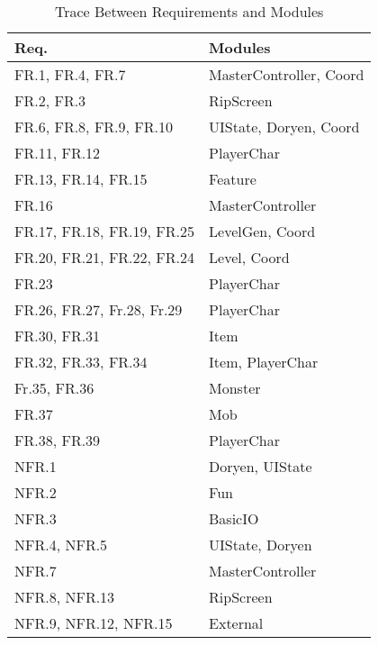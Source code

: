 \documentclass[12pt, titlepage]{article}
\begin{document}
	\begin{table}[H]
		\centering
		\begin{tabular}{p{} p{}}

			\toprule
			\textbf{Req.} & \textbf{Modules}\\
			\midrule

			FR.1, FR.4, FR.7 & MasterController, Coord\\
			FR.2, FR.3 & RipScreen\\
			FR.6, FR.8, FR.9, FR.10 & UIState, Doryen, Coord\\
			FR.11, FR.12 & PlayerChar\\
			FR.13, FR.14, FR.15 & Feature\\
			FR.16 & MasterController\\
			FR.17, FR.18, FR.19, FR.25 & LevelGen, Coord\\
			FR.20, FR.21, FR.22, FR.24 & Level, Coord\\
			FR.23 & PlayerChar\\
			FR.26, FR.27, Fr.28, Fr.29 & PlayerChar\\
			FR.30, FR.31 & Item\\
			FR.32, FR.33, FR.34 & Item, PlayerChar\\
			Fr.35, FR.36 & Monster\\
			FR.37 & Mob\\
			FR.38, FR.39 & PlayerChar\\
			\midrule
			NFR.1 & Doryen, UIState\\
			NFR.2 & Fun\\
			NFR.3 & BasicIO\\
			NFR.4, NFR.5 & UIState, Doryen\\
			NFR.7 & MasterController\\
			NFR.8, NFR.13 & RipScreen\\
			NFR.9, NFR.12, NFR.15 & External\\

			\bottomrule
		\end{tabular}

		\caption{Trace Between Requirements and Modules}
		\label{TblRT}
	\end{table}
\end{document}
